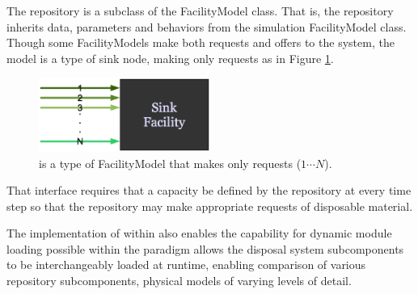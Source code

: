 The \Cyder repository is a subclass of the FacilityModel class.  That is, the 
repository inherits data, parameters and behaviors from the \Cyclus simulation 
FacilityModel class.  Though some FacilityModels make both requests and offers to the system, the \Cyder model is a type of sink node, making only requests as in Figure \ref{fig:sinkfacility}.

\begin{figure}[htb!]
  \begin{center}
    \includegraphics[width=0.5\textwidth]{./chapters/paradigm/sinkfacility.eps}
  \end{center}
  \caption[\Cyder request-only interface.]{\Cyder is a type of \Cyclus FacilityModel that makes only requests 
  ($1\cdots N$).}
  \label{fig:sinkfacility}
\end{figure}

That interface requires that a capacity be defined by the repository at every 
\Cyclus time step so that the repository may make appropriate requests of 
disposable material.  

The implementation of \Cyder within \Cyclus also enables the capability for 
dynamic module loading possible within the \Cyclus paradigm allows the disposal 
system subcomponents to be interchangeably loaded at runtime, enabling 
comparison of various repository subcomponents, physical models of varying 
levels of detail.  



